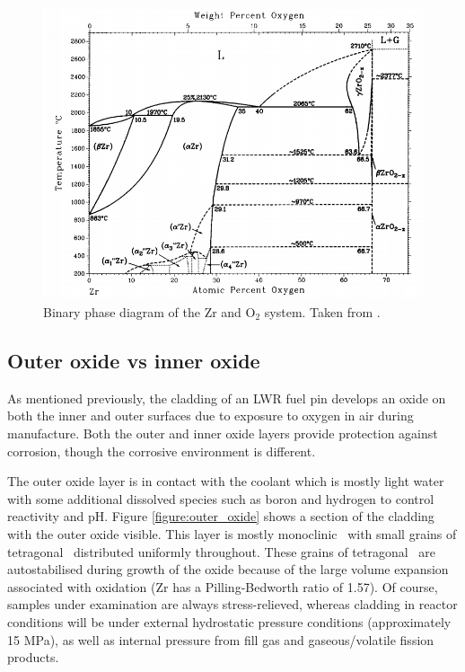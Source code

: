 \begin{figure}[htp]
\centering
\includegraphics[width=14cm]{images/zro2_binary_phase.png}
\caption[Binary phase diagram of the Zr and O$_{2}$ system.]{Binary phase diagram of the Zr and O$_{2}$ system. Taken from \cite{Abriata1986}.}
\label{figure:binary_phase_diagram}
\end{figure}

\subsection{Outer oxide vs inner oxide}

As mentioned previously, the cladding of an LWR fuel pin develops an oxide on both the inner and outer surfaces due to exposure to oxygen in air during manufacture. Both the outer and inner oxide layers provide protection against corrosion, though the corrosive environment is different. 

The outer oxide layer is in contact with the coolant which is mostly light water with some additional dissolved species such as boron and hydrogen to control reactivity and pH. Figure \ref{figure:outer_oxide} shows a section of the cladding with the outer oxide visible. This layer is mostly monoclinic \zirconia\ with small grains of tetragonal \zirconia\ distributed uniformly throughout. These grains of tetragonal \zirconia\ are autostabilised during growth of the oxide because of the large volume expansion associated with oxidation (Zr has a Pilling-Bedworth ratio of 1.57). Of course, samples under examination are always stress-relieved, whereas cladding in reactor conditions will be under external hydrostatic pressure conditions (approximately 15 MPa), as well as internal pressure from fill gas and gaseous/volatile fission products.

